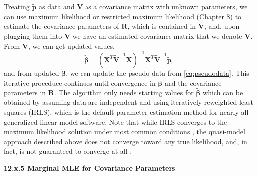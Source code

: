 \documentclass[12pt, titlepage]{article}
\begin{document}
Treating $\tilde{\mathbf{p}}$ as data and $\mathbf{V}$ as a covariance matrix with unknown parameters, we can use maximum likelihood or restricted maximum likelihood (Chapter 8) to estimate the covariance parameters of $\mathbf{R}$, which is contained in $\mathbf{V}$, and, upon plugging them into $\mathbf{V}$ we have an estimated covariance matrix that we denote $\tilde{\mathbf{V}}$.  From $\tilde{\mathbf{V}}$, we can get updated values,
$$
\tilde{\boldsymbol{\beta}} = (\mathbf{X}^{T}\tilde{\mathbf{V}}^{-1}\mathbf{X})^{-1}\mathbf{X}^{T}\tilde{\mathbf{V}}^{-1}\tilde{\mathbf{p}},
$$
and from updated $\tilde{\boldsymbol{\beta}}$, we can update the pseudo-data from \eqref{eq:pseudodata}.  This iterative proceduce continues until convergence in $\tilde{\boldsymbol{\beta}}$ and the covariance parameters in $\mathbf{R}$.  The algorithm only needs starting values for $\tilde{\boldsymbol{\beta}}$ which can be obtained by assuming data are independent and using iteratively reweighted least squares (IRLS), which is the default parameter estimation method for nearly all generalized linear model software.  Note that while IRLS converges to the maximum likelihood solution under most common conditions \citep{green_iteratively_1984}, the quasi-model approach described above does not converge toward any true likelihood, and, in fact, is not guaranteed to converge at all \citep{boykin_generalized_2010, kleinschmidt_use_2001,li_adjusting_2016}.


\vspace{.5cm}
{\large \flushleft \textbf{12.x.5 Marginal MLE for Covariance Parameters}}
\vspace{.5cm}
\end{document}
